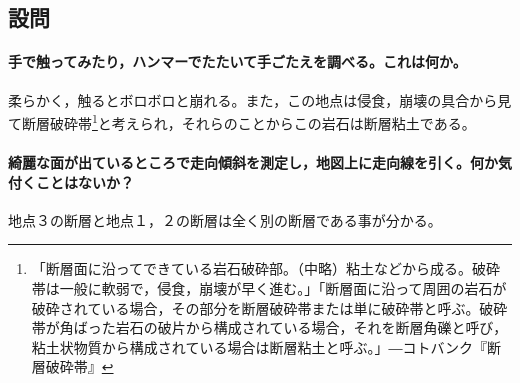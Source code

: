 \documentclass[uplatex,b5paper]{jsreport}
\begin{document}
    \subsection{設問}
      \paragraph{手で触ってみたり，ハンマーでたたいて手ごたえを調べる。これは何か。}
      柔らかく，触るとボロボロと崩れる。また，この地点は侵食，崩壊の具合から見て断層破砕帯\footnote{「断層面に沿ってできている岩石破砕部。（中略）粘土などから成る。破砕帯は一般に軟弱で，侵食，崩壊が早く進む。」「断層面に沿って周囲の岩石が破砕されている場合，その部分を断層破砕帯または単に破砕帯と呼ぶ。破砕帯が角ばった岩石の破片から構成されている場合，それを断層角礫と呼び，粘土状物質から構成されている場合は断層粘土と呼ぶ。」―コトバンク『断層破砕帯』}と考えられ，それらのことからこの岩石は断層粘土である。
      \paragraph{綺麗な面が出ているところで走向傾斜を測定し，地図上に走向線を引く。何か気付くことはないか？}
      地点３の断層と地点１，２の断層は全く別の断層である事が分かる。
\end{document}
